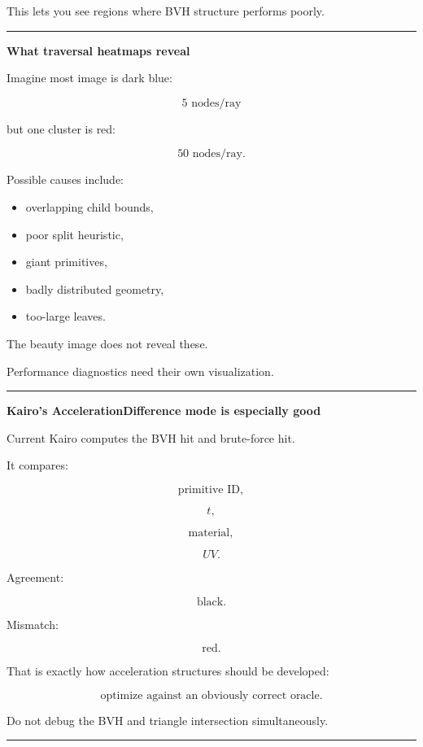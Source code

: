 This lets you see regions where BVH structure performs poorly.

\begin{center}\rule{0.5\linewidth}{0.5pt}\end{center}

\textbf{What traversal heatmaps reveal}

Imagine most image is dark blue:

\[
5\text{ nodes/ray}
\]

but one cluster is red:

\[
50\text{ nodes/ray}.
\]

Possible causes include:

\begin{itemize}
\tightlist
\item
  overlapping child bounds,
\item
  poor split heuristic,
\item
  giant primitives,
\item
  badly distributed geometry,
\item
  too-large leaves.
\end{itemize}

The beauty image does not reveal these.

Performance diagnostics need their own visualization.

\begin{center}\rule{0.5\linewidth}{0.5pt}\end{center}

\textbf{Kairo's AccelerationDifference mode is especially good}

Current Kairo computes the BVH hit and brute-force hit.

It compares:

\[
\text{primitive ID},
\]

\[
t,
\]

\[
\text{material},
\]

\[
UV.
\]

Agreement:

\[
\text{black}.
\]

Mismatch:

\[
\text{red}.
\]

That is exactly how acceleration structures should be developed:

\[
\boxed{
\text{optimize against an obviously correct oracle}.
}
\]

Do not debug the BVH and triangle intersection simultaneously.

\begin{center}\rule{0.5\linewidth}{0.5pt}\end{center}

